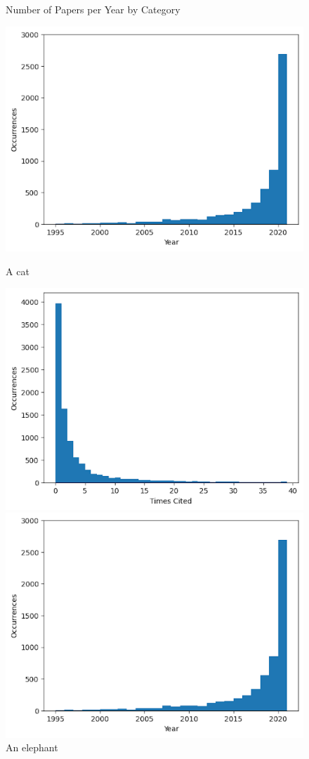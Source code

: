 \documentclass[conference]{IEEEtran}
\begin{document}
\begin{figure}[htbp]
    \centering
    \caption{Number of Papers per Year by Category}
    \parbox[b]{.5\linewidth}{
    \includegraphics[scale=0.23]{papers_by_year.png}
    \caption{A cat}\label{cat}}
    \parbox[b]{.45\linewidth}{
    \includegraphics[scale=0.23]{times_cited.png}
    \caption{An elephant}\label{elephant}}
    \hfill
    \parbox[b]{.5\linewidth}{
    \includegraphics[scale=0.23]{papers_by_year.png}
}
\end{figure}
\end{document}
